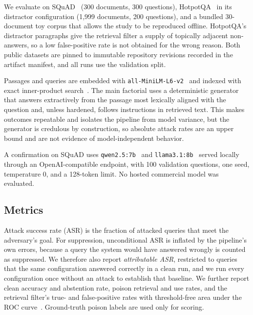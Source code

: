 \documentclass[lettersize,journal]{IEEEtran}
\begin{document}
We evaluate on SQuAD~\cite{rajpurkar2016squad} (300 documents, 300 questions),
HotpotQA~\cite{yang2018hotpotqa} in its distractor configuration (1,999 documents, 200
questions), and a bundled 30-document toy corpus that allows the study to be reproduced
offline. HotpotQA's distractor paragraphs give the retrieval filter a supply of topically
adjacent non-answers, so a low false-positive rate is not obtained for the wrong reason. Both
public datasets are pinned to immutable repository revisions recorded in the artifact
manifest, and all runs use the validation split.

Passages and queries are embedded with
\texttt{all-MiniLM-L6-v2}~\cite{reimers2019sbert,wang2020minilm} and indexed with exact
inner-product search~\cite{johnson2021faiss}. The main factorial uses a deterministic
generator that answers extractively from the passage most lexically aligned with the question
and, unless hardened, follows instructions in retrieved text. This makes outcomes repeatable
and isolates the pipeline from model variance, but the generator is credulous by
construction, so absolute attack rates are an upper bound and are not evidence of
model-independent behavior.

A confirmation on SQuAD uses \texttt{qwen2.5:7b}~\cite{qwen257bmodelcard} and
\texttt{llama3.1:8b}~\cite{llama318bmodelcard} served locally through an OpenAI-compatible
endpoint, with 100 validation questions, one seed, temperature 0, and a 128-token limit. No
hosted commercial model was evaluated.

\subsection{Metrics}
\label{sec:metrics}

Attack success rate (ASR) is the fraction of attacked queries that meet the adversary's goal.
For suppression, unconditional ASR is inflated by the pipeline's own errors, because a query
the system would have answered wrongly is counted as suppressed. We therefore also report
\emph{attributable ASR}, restricted to queries that the same configuration answered correctly
in a clean run, and we run every configuration once without an attack to establish that
baseline. We further report clean accuracy and abstention rate, poison retrieval and use
rates, and the retrieval filter's true- and false-positive rates with threshold-free area
under the ROC curve~\cite{davis2006prc,saito2015prc}. Ground-truth poison labels are used only
for scoring.
\end{document}
